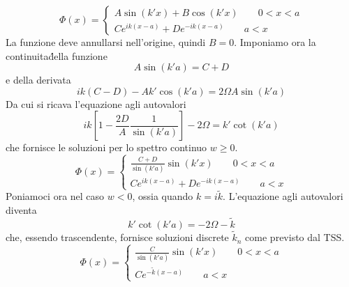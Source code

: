 \documentclass[a4paper]{article}
\begin{document}
        \begin{equation*}
            \Phi(x)=
            \begin{cases}
                A\sin(k'x)+B\cos(k'x) \quad\quad 0<x<a\\
                Ce^{ik(x-a)}+De^{-ik(x-a)} \quad\quad a<x
            \end{cases}
        \end{equation*}
        La funzione deve annullarsi nell'origine, quindi $B=0$.
        Imponiamo ora la continuita\' della funzione
        \begin{equation*}
            A\sin(k'a)=C+D
        \end{equation*}
        e della derivata
        \begin{equation*}
            ik(C-D)-Ak'\cos(k'a)=2\Omega A\sin(k'a)
        \end{equation*}
        Da cui si ricava l'equazione agli autovalori
        \begin{equation*}
            ik\left[1-\frac{2D}{A}\frac{1}{\sin(k'a)}\right]-2\Omega=k'\cot(k'a)
        \end{equation*}
        che fornisce le soluzioni per lo spettro continuo $w\geq 0$.
        \begin{equation*}
            \Phi(x)=
            \begin{cases}
                \frac{C+D}{\sin(k'a)}\sin(k'x) \quad\quad 0<x<a\\
                Ce^{ik(x-a)}+De^{-ik(x-a)} \quad\quad a<x
            \end{cases}
        \end{equation*}
        Poniamoci ora nel caso $w<0$, ossia quando $k=i\tilde{k}$.
        L'equazione agli autovalori diventa
        \begin{equation*}
            k'\cot(k'a)=-2\Omega-\tilde{k}
        \end{equation*}
        che, essendo trascendente, fornisce soluzioni discrete $\tilde{k}_n$ come previsto dal TSS.
        \begin{equation*}
            \Phi(x)=
            \begin{cases}
                \frac{C}{\sin(k'a)}\sin(k'x) \quad\quad 0<x<a\\
                Ce^{-\tilde{k}(x-a)} \quad\quad a<x
            \end{cases}
        \end{equation*}
\end{document}

